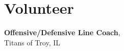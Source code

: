 \documentclass{TaylorTurnerResume2023}
\begin{document}
\begin{minipage}[t]{0.275\textwidth}
\section{Volunteer} 
{\textbf{Offensive/Defensive Line Coach},\\
Titans of Troy, IL}






\end{minipage} 
\end{document}
